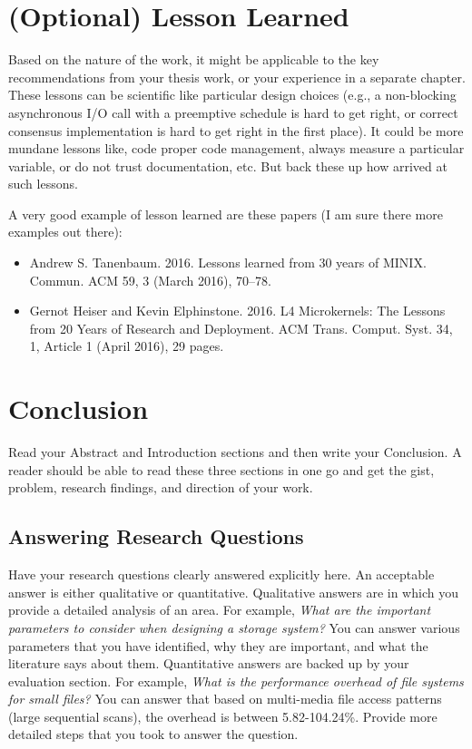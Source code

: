 \documentclass[11pt]{article}
\begin{document}
\newpage
\section{(Optional) Lesson Learned}
Based on the nature of the work, it might be applicable to the key recommendations from your thesis work, or your experience in a separate chapter. These lessons can be scientific like particular design choices (e.g., a non-blocking asynchronous I/O call with a preemptive schedule is hard to get right, or correct consensus implementation is hard to get right in the first place). It could be more mundane lessons like, code proper code management, always measure a particular variable, or do not trust documentation, etc. But back these up how arrived at such lessons. 

A very good example of lesson learned are these papers (I am sure there more examples out there): 
\begin{itemize}
    \item Andrew S. Tanenbaum. 2016. Lessons learned from 30 years of MINIX. Commun. ACM 59, 3 (March 2016), 70–78.
    \item Gernot Heiser and Kevin Elphinstone. 2016. L4 Microkernels: The Lessons from 20 Years of Research and Deployment. ACM Trans. Comput. Syst. 34, 1, Article 1 (April 2016), 29 pages. 
\end{itemize}

\newpage 
\section{Conclusion}
Read your Abstract and Introduction sections and then write your Conclusion. A reader should be able to read these three sections in one go and get the gist, problem, research findings, and direction of your work. 
\subsection{Answering Research Questions}
Have your research questions clearly answered explicitly here. An acceptable answer is either qualitative or quantitative. Qualitative answers are in which you provide a detailed analysis of an area. For example, \textit{What are the important parameters to consider when designing a storage system?} You can answer various parameters that you have identified, why they are important, and what the literature says about them. Quantitative answers are backed up by your evaluation section. For example, \textit{What is the performance overhead of file systems for small files?} You can answer that based on multi-media file access patterns (large sequential scans), the overhead is between 5.82-104.24\%. Provide more detailed steps that you took to answer the question.
\end{document}
